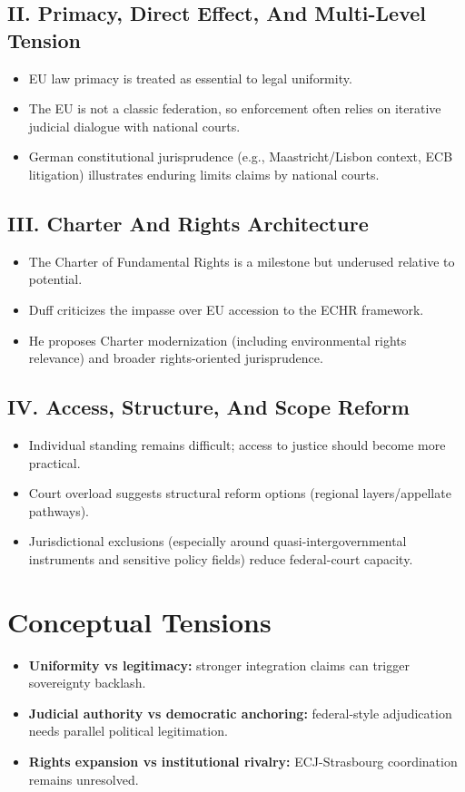 \documentclass[11pt,a4paper]{article}
\begin{document}
\subsection*{II. Primacy, Direct Effect, And Multi-Level Tension}
\begin{itemize}
\item EU law primacy is treated as essential to legal uniformity.
\item The EU is not a classic federation, so enforcement often relies on iterative judicial dialogue with national courts.
\item German constitutional jurisprudence (e.g., Maastricht/Lisbon context, ECB litigation) illustrates enduring limits claims by national courts.
\end{itemize}

\subsection*{III. Charter And Rights Architecture}
\begin{itemize}
\item The Charter of Fundamental Rights is a milestone but underused relative to potential.
\item Duff criticizes the impasse over EU accession to the ECHR framework.
\item He proposes Charter modernization (including environmental rights relevance) and broader rights-oriented jurisprudence.
\end{itemize}

\subsection*{IV. Access, Structure, And Scope Reform}
\begin{itemize}
\item Individual standing remains difficult; access to justice should become more practical.
\item Court overload suggests structural reform options (regional layers/appellate pathways).
\item Jurisdictional exclusions (especially around quasi-intergovernmental instruments and sensitive policy fields) reduce federal-court capacity.
\end{itemize}

\section*{Conceptual Tensions}
\begin{itemize}
\item \textbf{Uniformity vs legitimacy:} stronger integration claims can trigger sovereignty backlash.
\item \textbf{Judicial authority vs democratic anchoring:} federal-style adjudication needs parallel political legitimation.
\item \textbf{Rights expansion vs institutional rivalry:} ECJ-Strasbourg coordination remains unresolved.
\end{itemize}
\end{document}
